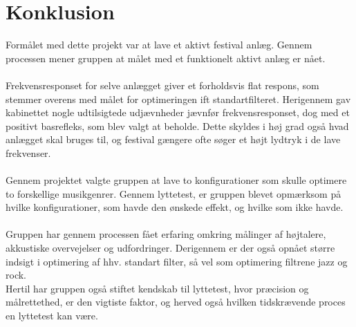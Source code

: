 \section{Konklusion}
Formålet med dette projekt var at lave et aktivt festival anlæg. Gennem processen mener gruppen at målet med et funktionelt aktivt anlæg er nået.  \\ \\
Frekvensresponset for selve anlægget giver et forholdsvis flat respons, som stemmer overens med målet for optimeringen ift standartfilteret. Herigennem gav kabinettet nogle udtilsigtede udjævnheder jævnfør frekvensresponset, dog med et positivt basrefleks, som blev valgt at beholde. Dette skyldes i høj grad også hvad anlægget skal bruges til, og festival gængere ofte søger et højt lydtryk i de lave frekvenser. \\ \\
Gennem projektet valgte gruppen at lave to konfigurationer som skulle optimere to forskellige musikgenrer. Gennem lyttetest, er gruppen blevet opmærksom på hvilke konfigurationer, som havde den ønskede effekt, og hvilke som ikke havde. \\ \\
Gruppen har gennem processen fået erfaring omkring målinger af højtalere, akkustiske overvejelser og udfordringer. Derigennem er der også opnået større indsigt i optimering af hhv. standart filter, så vel som optimering filtrene jazz og rock. \\ 
Hertil har gruppen også stiftet kendskab til lyttetest, hvor præcision og målrettethed, er den vigtiste faktor, og herved også hvilken tidskrævende proces en lyttetest kan være.  